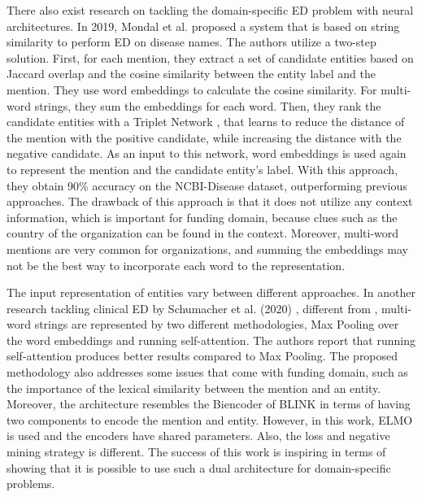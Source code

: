 \documentclass{report}
\theoremstyle{definition}
\theoremstyle{remark}
\begin{document}
There also exist research on tackling the domain-specific ED problem with neural architectures. In 2019, Mondal et al. \cite{MedicalTriplet} proposed a system that is based on string similarity to perform ED on disease names. The authors utilize a two-step solution. First, for each mention, they extract a set of candidate entities based on Jaccard overlap and the cosine similarity between the entity label and the mention. They use word embeddings to calculate the cosine similarity. For multi-word strings, they sum the embeddings for each word. Then, they rank the candidate entities with a Triplet Network \cite{tripletNetwork}, that learns to reduce the distance of the mention with the positive candidate, while increasing the distance with the negative candidate. As an input to this network, word embeddings is used again to represent the mention and the candidate entity's label. With this approach, they obtain 90\% accuracy on the NCBI-Disease dataset, outperforming previous approaches. The drawback of this approach is that it does not utilize any context information, which is important for funding domain, because clues such as the country of the organization can be found in the context. Moreover, multi-word mentions are very common for organizations, and summing the embeddings may not be the best way to incorporate each word to the representation.

The input representation of entities vary between different approaches. In another research tackling clinical ED by Schumacher et al. (2020) \cite{ClinicalConcept}, different from \cite{MedicalTriplet},  multi-word strings are represented by two different methodologies, Max Pooling over the word embeddings and running self-attention. The authors report that running self-attention produces better results compared to Max Pooling. The proposed methodology also addresses some issues that come with funding domain, such as the importance of the lexical similarity between the mention and an entity. Moreover, the architecture resembles the Biencoder of BLINK in terms of having two components to encode the mention and entity. However, in this work, ELMO \cite{elmo} is used and the encoders have shared parameters. Also, the loss and negative mining strategy is different. The success of this work is inspiring in terms of showing that it is possible to use such a dual architecture for domain-specific problems. 
\end{document}
